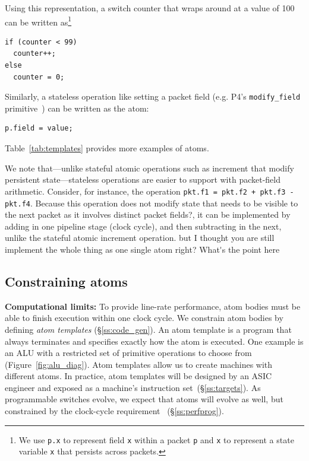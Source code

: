 Using this representation, a switch counter that wraps around at a
value of 100 can be written as\footnote{We use {\tt p.x} to
  represent field {\tt x} within a packet {\tt p} and {\tt x} to
  represent a state variable {\tt x} that persists across packets.}
\begin{lstlisting}[style=customc, numbers=none, frame=none]
if (counter < 99)
  counter++;
else
  counter = 0;
\end{lstlisting}
Similarly, a stateless operation like setting a packet field
(e.g. P4's {\tt modify\_field} primitive~\cite{p4spec}) can be written
as the atom:
\begin{lstlisting}[style=customc, numbers=none, frame=none]
  p.field = value;
\end{lstlisting}
Table~\ref{tab:templates} provides more examples of atoms.

We note that---unlike stateful atomic operations such as increment
that modify persistent state---stateless operations are easier to
support with packet-field arithmetic. Consider, for instance, the
operation {\tt pkt.f1 = pkt.f2 + pkt.f3 - pkt.f4}. Because this operation
does not modify state that needs to be visible to the next packet 
\ac{as it involves distinct packet fields?}, it
can be implemented by adding in one pipeline stage (clock cycle), and
then subtracting in the next, unlike the stateful atomic increment
operation. \ac{but I thought you are still implement the whole thing 
as one single atom right? What's the point here}


\subsection{Constraining atoms}
\label{s:atomConstraints}

\textbf{Computational limits:} To provide line-rate performance, atom
bodies must be able to finish execution within one clock cycle. We
constrain atom bodies by defining {\it atom templates}
(\S\ref{ss:code_gen}).  An atom template is a program that always
terminates and specifies exactly how the atom is executed. One example
is an ALU with a restricted set of primitive operations to choose from
(Figure~\ref{fig:alu_diag}). Atom templates allow us to create
\absmachine machines with different atoms.  In practice, atom
templates will be designed by an ASIC engineer and exposed as a
machine's instruction set~(\S\ref{ss:targets}).  As programmable
switches evolve, we expect that atoms will evolve as well, but
constrained by the clock-cycle requirement ~(\S\ref{ss:perfprog}).


